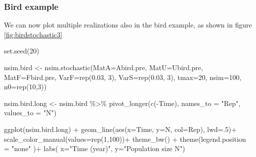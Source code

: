 \documentclass[
]{book}
\newenvironment{Shaded}{\begin{snugshade}}{\end{snugshade}}
\newcommand{\AttributeTok}[1]{\textcolor[rgb]{0.77,0.63,0.00}{#1}}
\newcommand{\DecValTok}[1]{\textcolor[rgb]{0.00,0.00,0.81}{#1}}
\newcommand{\FloatTok}[1]{\textcolor[rgb]{0.00,0.00,0.81}{#1}}
\newcommand{\FunctionTok}[1]{\textcolor[rgb]{0.00,0.00,0.00}{#1}}
\newcommand{\NormalTok}[1]{#1}
\newcommand{\OtherTok}[1]{\textcolor[rgb]{0.56,0.35,0.01}{#1}}
\newcommand{\SpecialCharTok}[1]{\textcolor[rgb]{0.00,0.00,0.00}{#1}}
\newcommand{\StringTok}[1]{\textcolor[rgb]{0.31,0.60,0.02}{#1}}
\begin{document}
\hypertarget{bird-example-18}{%
\subsubsection*{Bird example}\label{bird-example-18}}

We can now plot multiple realizations also in the bird example, as shown in figure \ref{fig:birdstochastic3}

\begin{Shaded}
\begin{Highlighting}[]
\FunctionTok{set.seed}\NormalTok{(}\DecValTok{20}\NormalTok{)}

\NormalTok{nsim.bird }\OtherTok{\textless{}{-}} \FunctionTok{nsim.stochastic}\NormalTok{(}\AttributeTok{MatA=}\NormalTok{Abird.pre, }\AttributeTok{MatU=}\NormalTok{Ubird.pre, }\AttributeTok{MatF=}\NormalTok{Fbird.pre,  }\AttributeTok{VarF=}\FunctionTok{rep}\NormalTok{(}\FloatTok{0.03}\NormalTok{, }\DecValTok{3}\NormalTok{), }\AttributeTok{VarS=}\FunctionTok{rep}\NormalTok{(}\FloatTok{0.03}\NormalTok{, }\DecValTok{3}\NormalTok{), }\AttributeTok{tmax=}\DecValTok{20}\NormalTok{, }\AttributeTok{nsim=}\DecValTok{100}\NormalTok{, }\AttributeTok{n0=}\FunctionTok{rep}\NormalTok{(}\DecValTok{10}\NormalTok{,}\DecValTok{3}\NormalTok{))}


\NormalTok{nsim.bird.long }\OtherTok{\textless{}{-}}\NormalTok{ nsim.bird }\SpecialCharTok{\%\textgreater{}\%} \FunctionTok{pivot\_longer}\NormalTok{(}\FunctionTok{c}\NormalTok{(}\SpecialCharTok{{-}}\NormalTok{Time),}
               \AttributeTok{names\_to =} \StringTok{"Rep"}\NormalTok{, }\AttributeTok{values\_to =} \StringTok{"N"}\NormalTok{)}

\FunctionTok{ggplot}\NormalTok{(nsim.bird.long) }\SpecialCharTok{+} 
  \FunctionTok{geom\_line}\NormalTok{(}\FunctionTok{aes}\NormalTok{(}\AttributeTok{x=}\NormalTok{Time, }\AttributeTok{y=}\NormalTok{N, }\AttributeTok{col=}\NormalTok{Rep), }\AttributeTok{lwd=}\NormalTok{.}\DecValTok{5}\NormalTok{)}\SpecialCharTok{+}
  \FunctionTok{scale\_color\_manual}\NormalTok{(}\AttributeTok{values=}\FunctionTok{rep}\NormalTok{(}\DecValTok{1}\NormalTok{,}\DecValTok{100}\NormalTok{))}\SpecialCharTok{+}
  \FunctionTok{theme\_bw}\NormalTok{() }\SpecialCharTok{+}
   \FunctionTok{theme}\NormalTok{(}\AttributeTok{legend.position =} \StringTok{"none"}\NormalTok{ )}\SpecialCharTok{+}
  \FunctionTok{labs}\NormalTok{( }\AttributeTok{x=}\StringTok{"Time (year)"}\NormalTok{, }\AttributeTok{y=}\StringTok{"Population size N"}\NormalTok{) }
\end{Highlighting}
\end{Shaded}
\end{document}
